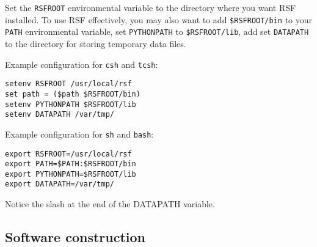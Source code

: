Set the \texttt{RSFROOT} environmental variable to the directory where
you want RSF installed. To use RSF effectively, you may also want to add
\texttt{\$RSFROOT/bin} to your \texttt{PATH} environmental variable, set
\texttt{PYTHONPATH} to \texttt{\$RSFROOT/lib}, add set \texttt{DATAPATH} to
the directory for storing temporary data files. 

Example configuration for \texttt{csh} and \texttt{tcsh}:
\begin{verbatim}
setenv RSFROOT /usr/local/rsf
set path = ($path $RSFROOT/bin)
setenv PYTHONPATH $RSFROOT/lib
setenv DATAPATH /var/tmp/
\end{verbatim}

Example configuration for \texttt{sh} and \texttt{bash}:
\begin{verbatim}
export RSFROOT=/usr/local/rsf
export PATH=$PATH:$RSFROOT/bin
export PYTHONPATH=$RSFROOT/lib
export DATAPATH=/var/tmp/
\end{verbatim}

Notice the slash at the end of the DATAPATH variable.

\subsection{Software construction}


